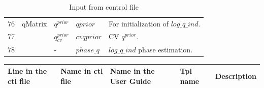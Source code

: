 \documentclass{article}
\begin{document}
\begin{table}[H]
\begin{tabular}{||  p{1.5cm} | p{1.9cm}  | p{1.9cm} | l | p{7cm} ||}
76 & qMatrix & $q^{prior}$  &  $qprior$& For initialization of $log\_q\_ind$.\\ %
77 &  &  $q^{prior}_{cv}$ &  $cvqprior$& CV $q^{prior}$.\\ %
78 &  & -  &  $phase\_q$& $log\_q\_ind$ phase estimation.\\ \hline
\end{tabular} 
    \caption{Input from control file}
    \label{tab:my_label2}
\end{table}


\begin{table}[H]
    \centering
    \begin{tabular}{|| p{0.9cm} | p{4.0cm}  | p{1.9cm} | l | p{6cm} ||}
\hline
Line in the ctl file & Name in ctl file  & Name in the User Guide & Tpl name & Description\\ \hline \hline


\end{tabular}
\end{table}
\end{document}

